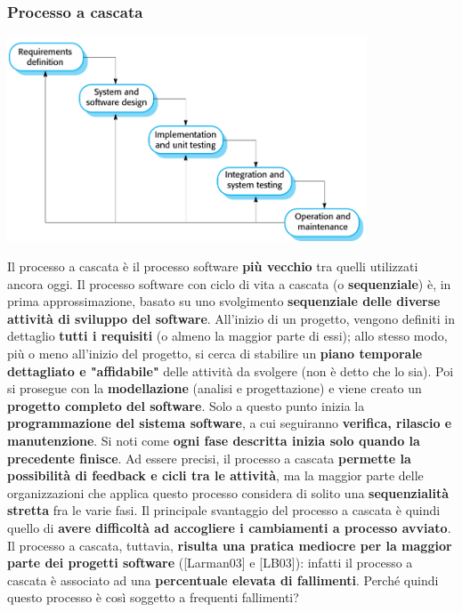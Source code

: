 \documentclass[12pt]{article}
\begin{document}
\subsubsection{Processo a cascata}
\begin{center}
    \includegraphics[width = 0.80\textwidth]{Images/14.png}
\end{center}
Il processo a cascata è il processo software \textbf{più vecchio} tra quelli utilizzati ancora oggi.
Il processo software con ciclo di vita a cascata (o \textbf{sequenziale}) è, in prima approssimazione, basato su uno svolgimento \textbf{sequenziale delle diverse attività di sviluppo del software}.
All'inizio di un progetto, vengono definiti in dettaglio \textbf{tutti i requisiti} (o almeno la maggior parte di essi); allo stesso modo, più o meno all'inizio del progetto, si cerca di stabilire un \textbf{piano temporale dettagliato e "affidabile"} delle attività da svolgere (non è detto che lo sia).
Poi si prosegue con la \textbf{modellazione} (analisi e progettazione) e viene creato un \textbf{progetto completo del software}. Solo a questo punto inizia la \textbf{programmazione del sistema software}, a cui seguiranno \textbf{verifica, rilascio e manutenzione}. Si noti come \textbf{ogni fase descritta inizia solo quando la precedente finisce}.
Ad essere precisi, il processo a cascata \textbf{permette la possibilità di feedback e cicli tra le attività}, ma la maggior parte delle organizzazioni che applica questo processo considera di solito una \textbf{sequenzialità stretta} fra le varie fasi.
Il principale svantaggio del processo a cascata è quindi quello di \textbf{avere difficoltà ad accogliere i cambiamenti a processo avviato}.
Il processo a cascata, tuttavia, \textbf{risulta una pratica mediocre per la maggior parte dei progetti software} ([Larman03] e [LB03]): infatti il processo a cascata è associato ad una \textbf{percentuale elevata di fallimenti}. Perché quindi questo processo è così soggetto a frequenti fallimenti?
\end{document}
